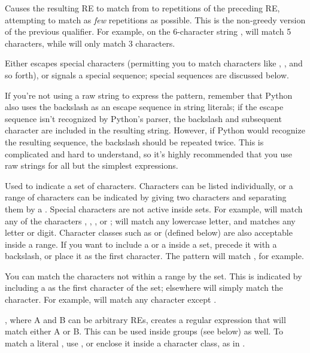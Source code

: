 \begin{list}{}{\leftmargin 0.7in }
\item[\code{\{\var{m},\var{n}\}?}] Causes the resulting RE to
match from  to  repetitions of the preceding RE,
attempting to match as \emph{few} repetitions as possible.  This is
the non-greedy version of the previous qualifier.  For example, on the
6-character string ,  will match 5
 characters, while  will only match 3
characters.

\item[\character{\e}] Either escapes special characters (permitting
you to match characters like \character{*}, , and so
forth), or signals a special sequence; special sequences are discussed
below.

If you're not using a raw string to
express the pattern, remember that Python also uses the
backslash as an escape sequence in string literals; if the escape
sequence isn't recognized by Python's parser, the backslash and
subsequent character are included in the resulting string.  However,
if Python would recognize the resulting sequence, the backslash should
be repeated twice.  This is complicated and hard to understand, so
it's highly recommended that you use raw strings for all but the
simplest expressions.

\item[\code{[]}] Used to indicate a set of characters.  Characters can
be listed individually, or a range of characters can be indicated by
giving two characters and separating them by a \character{-}.  Special
characters are not active inside sets.  For example, \regexp{[akm\$]}
will match any of the characters , ,
, or \character{\$}; \regexp{[a-z]}
will match any lowercase letter, and \code{[a-zA-Z0-9]} matches any
letter or digit.  Character classes such as  or 
(defined below) are also acceptable inside a range.  If you want to
include a \character{]} or a \character{-} inside a set, precede it with a
backslash, or place it as the first character.  The 
pattern \regexp{[]]} will match \code{']'}, for example.  

You can match the characters not within a range by 
the set.  This is indicated by including a
\character{\^} as the first character of the set; \character{\^} elsewhere will
simply match the \character{\^} character.  For example, \regexp{[{\^}5]}
will match any character except .

\item[\character{|}], where A and B can be arbitrary REs,
creates a regular expression that will match either A or B.  This can
be used inside groups (see below) as well.  To match a literal \character{|},
use \regexp{\e|}, or enclose it inside a character class, as in  \regexp{[|]}.


\end{list}
